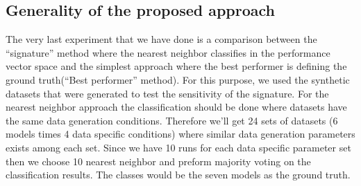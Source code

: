 \subsection{Generality of the proposed approach}
\label{Classification}

The very last experiment that we have done is a comparison between the ``signature'' method where the nearest neighbor classifies in the performance vector space and the simplest approach where the best performer is defining the ground truth(``Best performer'' method). For this purpose, we used the synthetic datasets that were generated to test the sensitivity of the signature. For the nearest neighbor approach the classification should be done where datasets have the same data generation conditions. Therefore we'll get 24 sets of datasets (6 models times 4 data specific conditions) where similar data generation parameters exists among each set. Since we have 10 runs for each data specific parameter set then we choose 10 nearest neighbor and preform majority voting on the classification results. The classes would be the seven models as the ground truth.
